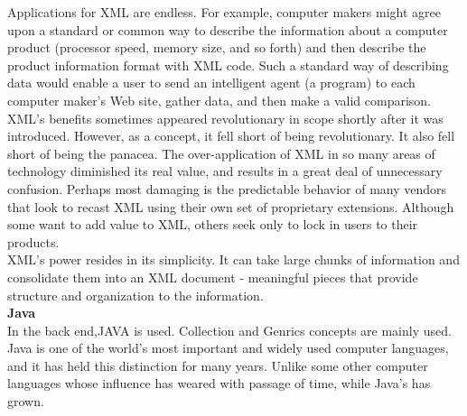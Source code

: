 Applications for XML are endless. For example, computer makers might agree upon a standard or common way to describe the information about a computer product (processor speed, memory size, and so forth) and then describe the product information format with XML code. Such a standard way of describing data would enable a user to send an intelligent agent (a program) to each computer maker's Web site, gather data, and then make a valid comparison.\\
XML's benefits sometimes appeared revolutionary in scope shortly after it was introduced. However, as a concept, it fell short of being revolutionary. It also fell short of being the panacea. The over-application of XML in so many areas of technology diminished its real value, and results in a great deal of unnecessary confusion. Perhaps most damaging is the predictable behavior of many vendors that look to recast XML using their own set of proprietary extensions. Although some want to add value to XML, others seek only to lock in users to their products.\\
XML's power resides in its simplicity. It can take large chunks of information and consolidate them into an XML document ‑ meaningful pieces that provide structure and organization to the information.\\
\textbf{Java}\\
In the back end,JAVA is used. Collection and Genrics concepts are mainly used. Java is one of the world's most important and widely used computer languages, and it has held this distinction for many years. Unlike some other computer languages whose influence has weared with passage of time, while Java's has grown.\\

